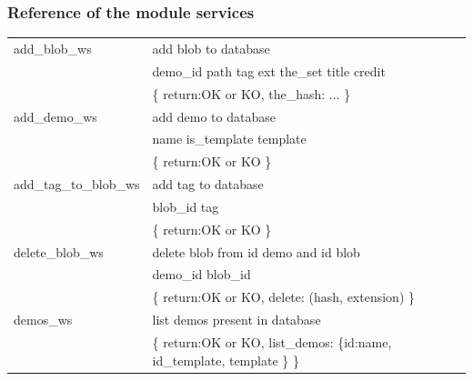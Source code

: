 \subsubsection{Reference of the module services}

\begin{flushleft}
\begin{longtable}
                   {|C{\tabcolsep}
                     ||
                    L{\tabcolsep}|}
  \hline
  {add\_blob\_ws}
                  & add blob to database \\
                  & {demo\_id path tag ext the\_set title credit} \\
                  & {\{  return:OK or KO, the\_hash: ...  \}} \\
  \hline
  {add\_demo\_ws}
                  & add demo to database \\
                  & {name is\_template template }\\
                  & { \{ return:OK or KO \} }\\
  \hline
  {add\_tag\-\_to\_blob\_ws}
                  & add tag to database \\
                  & { blob\_id tag }\\
                  & { \{ return:OK or KO \} }\\
  \hline
  {delete\_blob\_ws}
                  & delete blob from id demo and id blob \\
                  & {demo\_id blob\_id} \\
                  & { \{ return:OK or KO, delete: (hash, extension) \}} \\
  \hline
  {demos\_ws}
                  & list demos present  in database \\
                  & {\{ return:OK or KO,
                        list\_demos: \{id:name, id\_template, template \} \}} \\

\end{longtable}
\end{flushleft}
